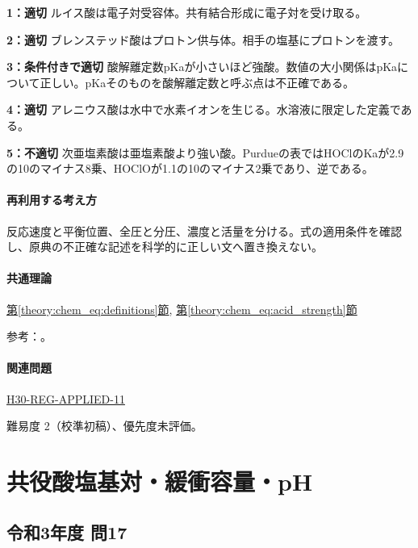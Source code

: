 \noindent\textbf{1：適切} ルイス酸は電子対受容体。共有結合形成に電子対を受け取る。\par

\noindent\textbf{2：適切} ブレンステッド酸はプロトン供与体。相手の塩基にプロトンを渡す。\par

\noindent\textbf{3：条件付きで適切} 酸解離定数pKaが小さいほど強酸。数値の大小関係はpKaについて正しい。pKaそのものを酸解離定数と呼ぶ点は不正確である。\par

\noindent\textbf{4：適切} アレニウス酸は水中で水素イオンを生じる。水溶液に限定した定義である。\par

\noindent\textbf{5：不適切} 次亜塩素酸は亜塩素酸より強い酸。Purdueの表ではHOClのKaが2.9の10のマイナス8乗、HOClOが1.1の10のマイナス2乗であり、逆である。\par

\paragraph{再利用する考え方} 反応速度と平衡位置、全圧と分圧、濃度と活量を分ける。式の適用条件を確認し、原典の不正確な記述を科学的に正しい文へ置き換えない。

\paragraph{共通理論} \hyperref[theory:chem_eq:definitions]{第\ref*{theory:chem_eq:definitions}節}, \hyperref[theory:chem_eq:acid_strength]{第\ref*{theory:chem_eq:acid_strength}節}

\par 参考：\cite{iupac_greenbook2012,purdue_acid_strength}。

\paragraph{関連問題} \hyperref[q:h30-reg-applied-11]{H30-REG-APPLIED-11}

\par 難易度 2（校準初稿）、優先度未評価。

\section{共役酸塩基対・緩衝容量・pH}

\subsection{令和3年度 問17}
\label{q:r03-reg-applied-17}

